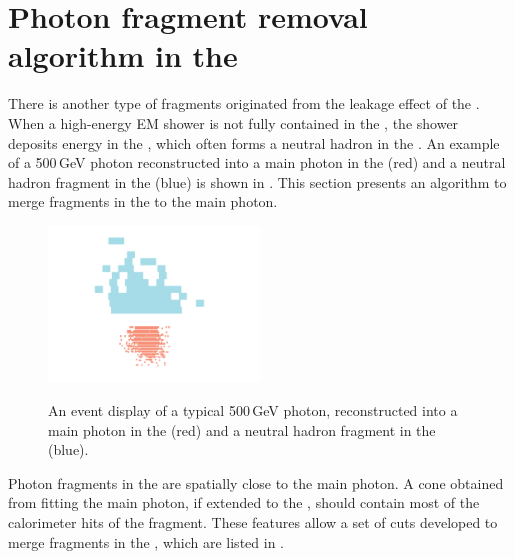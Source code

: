 
\section{Photon fragment removal algorithm in the \HCAL}
\label{sec:photonHighEFragRemoval}


There is another type of fragments originated from the leakage effect of the \ECAL. When a high-energy EM shower is not fully contained in the \ECAL, the shower deposits energy in the \HCAL, which often forms a neutral hadron in the \HCAL. An example of a 500\,GeV photon reconstructed into a main photon in the \ECAL (red) and a neutral hadron fragment in the \HCAL (blue) is shown in . This section presents an algorithm to merge fragments in the \HCAL to the main photon.



\begin{figure}[tbph]
\centering
{\includegraphics[width=0.5\textwidth]{photon/hcalfrag2}}%
\caption{An event display of a typical 500\,GeV photon, reconstructed into a main photon in the \ECAL (red) and a neutral hadron fragment in the \HCAL (blue).}
\label{fig:photonEvtDspHCalFrag}
\end{figure}

Photon fragments in the \HCAL are  spatially close to the main photon. A cone obtained from fitting the main photon, if extended to the \HCAL, should contain most of the calorimeter hits of the fragment. These features allow a set of cuts developed to merge  fragments in the \HCAL, which are listed in .


